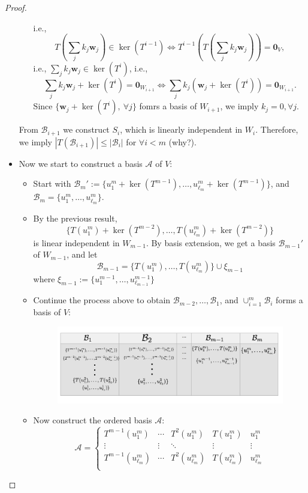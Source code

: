 \begin{proof}
\begin{itemize}
\begin{itemize}
\[\]
i.e.,
\[
T\left(\sum_jk_j\bm w_j\right)\in\ker(T^{i-1})
\Longleftrightarrow
T^{i-1}(T(\sum_jk_j\bm w_j))=\bm0_V,
\]
i.e., $\sum_jk_j\bm w_j\in\ker(T^i)$,
i.e.,
\[
\sum_jk_j\bm w_j +\ker(T^i) = \bm0_{W_{i+1}}
\Longleftrightarrow
\sum_jk_j(\bm w_j+\ker(T^i))=\bm0_{W_{i+1}}.
\]
Since $\{\bm w_j+\ker(T^i),\ \forall j\}$ fomrs a basis of $W_{i+1}$, we imply $k_j=0,\forall j$.
\end{itemize}
From $\mathcal{B}_{i+1}$ we construct $S_i$, which is linearly independent in $W_i$. Therefore, we imply $|T(\mathcal{B}_{i+1})|\le|\mathcal{B}_i|$ for $\forall i<m$ (why?).
\item
Now we start to construct a basis $\mathcal{A}$ of $V$:
\begin{itemize}
\item
Start with $\mathcal{B}_m':=\{u_1^{m}+\ker(T^{m-1}),\dots,u_{\ell_m}^m+\ker(T^{m-1})\}$, and $\mathcal{B}_m=\{u_1^m,\dots,u_{\ell_m}^m\}$.
\item
By the previous result, 
\[
\{T(u_1^m)+\ker(T^{m-2}),\dots,T(u_{\ell_m}^m)+\ker(T^{m-2})\}
\]
is linear independent in $W_{m-1}$.
By basis extension, we get a basis $\mathcal{B}_{m-1}'$ of $W_{m-1}$, and let
\[
\mathcal{B}_{m-1} = \{T(u_1^m),\dots,T(u_{\ell_m}^m)\}\cup\xi_{m-1}
\]
where $\xi_{m-1}:=\{u^{m-1}_{1},\dots,u^{m-1}_{\ell_{m-1}}\}$
\item
Continue the process above to obtain $\mathcal{B}_{m-2},\dots,\mathcal{B}_1$, and $\cup_{i=1}^m\mathcal{B}_i$ forms a basis of $V$:
\begin{figure}[H]
\centering
\includegraphics[width=1\textwidth]{week9/p_2}
\end{figure}
\item
Now construct the ordered basis $\mathcal{A}$:
\[
\mathcal{A}=
\left\{
\begin{array}{ccccc}
T^{m-1}(u_1^m)&\cdots&T^{2}(u_1^m)&T(u_1^m)&u_1^m\\
\vdots&\vdots&\ddots&\vdots&\vdots\\
T^{m-1}(u_{\ell_m}^m)&\cdots&T^{2}(u_{\ell_m}^m)&T(u_{\ell_m}^m)&u_{\ell_m}^m\\

\end{array}\]
\end{itemize}
\end{itemize}
\end{proof}
